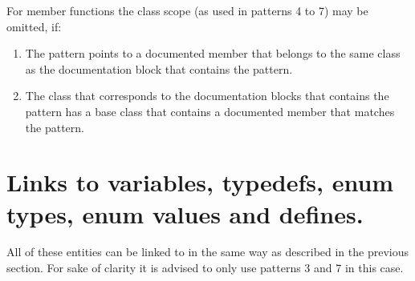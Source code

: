 For member functions the class scope (as used in patterns 4 to 7) may be omitted, if: \begin{enumerate}
\item The pattern points to a documented member that belongs to the same class as the documentation block that contains the pattern. \item The class that corresponds to the documentation blocks that contains the pattern has a base class that contains a documented member that matches the pattern. \end{enumerate}
\hypertarget{autolink_linkother}{}\section{Links to variables, typedefs, enum types, enum values and defines.}\label{autolink_linkother}
All of these entities can be linked to in the same way as described in the previous section. For sake of clarity it is advised to only use patterns 3 and 7 in this case.

